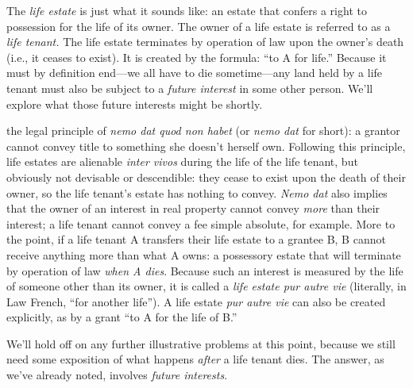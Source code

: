 The \textit{life estate} is just what it sounds like: an estate that confers a
right to possession for the life of its owner. The owner of a life estate is
referred to as a \textit{life tenant. }The life estate terminates by operation
of law upon the owner's death (i.e., it ceases to exist). It is created by the
formula: ``to A for life.'' Because it must by definition end---we all have to
die sometime---any land held by a life tenant must also be subject to a
\textit{future interest} in some other person. We'll explore what those future
interests might be shortly.

the legal principle of \textit{nemo dat quod non habet} (or \textit{nemo dat}
for short):
a grantor cannot convey title to something she doesn't herself own.
Following this principle, life estates are alienable \textit{inter vivos}
during the life of the life tenant, but obviously not devisable or
descendible: they cease to exist upon the death of their owner, so the life
tenant's estate has nothing to convey. \textit{Nemo dat} also implies that the
owner of an interest in real property cannot convey \textit{more} than their
interest; a life tenant cannot convey a fee simple absolute, for example. More
to the point, if a life tenant A transfers their life estate to a grantee B, B
cannot receive anything more than what A owns: a possessory estate that will
terminate by operation of law \textit{when A dies}. Because such an interest is
measured by the life of someone other than its owner, it is called a
\textit{life estate pur autre vie} (literally, in Law French, ``for another
life''). A life estate \textit{pur autre vie} can also be created explicitly,
as by a grant ``to A for the life of B.''

We'll hold off on any further illustrative problems at this point, because we
still need some exposition of what happens \textit{after} a life tenant dies.
The answer, as we've already noted, involves \textit{future interests}.

